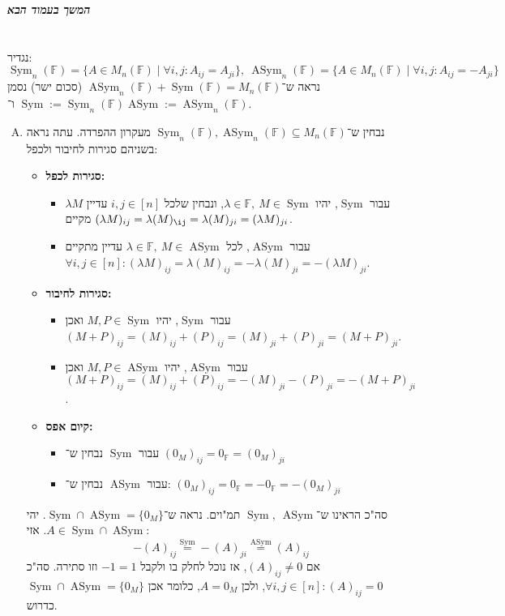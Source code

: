 \documentclass[]{article}
\newcommand\npage {\vfil {\hfil \textbf{\textit{המשך בעמוד הבא}}} \hfil \vfil \pagebreak}
\DeclareMathOperator{\Sym}     {Sym}
\DeclareMathOperator{\ASym}    {ASym}
\newcommand\F         {\mathbb{F}}
\newcommand\co        {\colon}
\renewcommand\lg      {\lambda}
\theoremstyle{definition}
\begin{document}
	\npage
	
	\section{}
	נגדיר: 
	\[ \Sym_n(\F) = \{A \in M_n(\F) \mid \forall i, j \co A_{ij} = A_{ji}\}, \ \ASym_n(\F) = \{A \in M_n(\F) \mid \forall i, j \co A_{ij} = -A_{ji}\} \]
	נראה ש־$\ASym_n(\F) + \Sym(\F) = M_n(\F)$ (סכום ישר) נסמן $\Sym := \Sym_n(\F)$ ו־$\ASym := \ASym_n(\F)$. 
	
	\begin{enumerate}[(A)]
		\item נבחין ש־$\Sym_n(\F), \ASym_n(\F) \subseteq M_n(\F)$ מעקרון ההפרדה. עתה נראה בשניהם סגירות לחיבור ולכפל: 
		\begin{itemize}
			\item \textbf{סגירות לכפל: }
			\begin{itemize}
				\item עבור $\Sym$, יהיו $\lg \in \F, \ M \in \Sym$, ונבחין שלכל $i, j \in [n]$ עדיין $\lg M$ מקיים $(\lg M)_{ij} = \lg (M)_{\ij} = \lg (M)_{ji} = (\lg M)_{ji}$. 
				\item עבור $\ASym$, לכל $\lg \in \F , \ M \in \ASym$ עדיין מתקיים $\forall i, j \in [n]\co (\lg M)_{ij} = \lg (M)_{ij} = -\lg (M)_{ji} = -(\lg M)_{ji}$. 
			\end{itemize}
			\item \textbf{סגירות לחיבור: }
			\begin{itemize}
				\item עבור $\Sym$, יהיו $M, P \in \Sym$ ואכן $(M + P)_{ij} = (M)_{ij} + (P)_{ij} = (M)_{ji} + (P)_{ji} = (M + P)_{ji}$. 
				\item עבור $\ASym$, יהיו $M, P \in \ASym$ ואכן $(M + P)_{ij} = (M)_{ij} + (P)_{ij} = -(M)_{ji} - (P)_{ji} = -(M + P)_{ji}$. 
			\end{itemize}
			\item \textbf{קיום אפס: }
			\begin{itemize}
				\item עבור $\Sym$ נבחין ש־
				$(0_M)_{ij} = 0_\F = (0_M)_{ji}$
				\item עבור $\ASym$ נבחין ש־: 
				$(0_M)_{ij} = 0_\F = -0_\F = -(0_M)_{ji}$
			\end{itemize}
		\end{itemize}
		סה"כ הראינו ש־$\Sym, \ \ASym$ תמ"וים. נראה ש־$\Sym \cap \ASym = \{0_M\}$. יהי $A \in \Sym \cap \ASym$. אזי: 
		\[ -(A)_{ij} \!\overset{\Sym}{=}\! -(A)_{ji} \!\overset{\ASym}{=}\! (A)_{ij} \]
		אם $(A)_{ij} \neq 0$, אז נוכל לחלק בו ולקבל $-1 = 1$ וזו סתירה. סה"כ $\forall i, j \in [n] \co (A)_{ij} = 0$, ולכן $A = 0_M$, כלומר אכן $\Sym \cap \ASym = \{0_M\}$ כדרוש. 

\end{enumerate}
\end{document}
